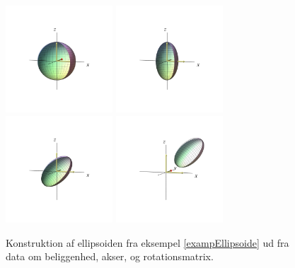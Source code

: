 \begin{figure}[ht]
\centerline{  \includegraphics[height=40mm]{FIGS/plotEllConstr1.pdf} \includegraphics[height=40mm]{FIGS/plotEllConstr2.pdf} \includegraphics[height=40mm]{FIGS/plotEllConstr3.pdf}
\includegraphics[height=40mm]{FIGS/plotEllConstr4.pdf}}
\begin{center}
\caption{Konstruktion af ellipsoiden fra eksempel \ref{exampEllipsoide}  ud fra data om beliggenhed, akser, og rotations\-matrix.} \label{figEllConstr}
\end{center}
\end{figure}

